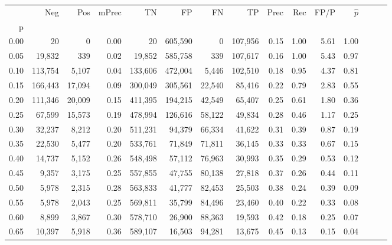 \begin{tabular}{rrrrrrrrrrrrrrr}
\toprule
{} &      Neg &     Pos & mPrec &       TN &       FP &       FN &       TP &  Prec &   Rec &  FP/P & $\hat{p}$ \\
p    &          &         &       &          &          &          &          &       &       &       &           \\
\midrule
0.00 &       20 &       0 &  0.00 &       20 &  605,590 &        0 &  107,956 &  0.15 &  1.00 &  5.61 &      1.00 \\
0.05 &   19,832 &     339 &  0.02 &   19,852 &  585,758 &      339 &  107,617 &  0.16 &  1.00 &  5.43 &      0.97 \\
0.10 &  113,754 &   5,107 &  0.04 &  133,606 &  472,004 &    5,446 &  102,510 &  0.18 &  0.95 &  4.37 &      0.81 \\
0.15 &  166,443 &  17,094 &  0.09 &  300,049 &  305,561 &   22,540 &   85,416 &  0.22 &  0.79 &  2.83 &      0.55 \\
0.20 &  111,346 &  20,009 &  0.15 &  411,395 &  194,215 &   42,549 &   65,407 &  0.25 &  0.61 &  1.80 &      0.36 \\
0.25 &   67,599 &  15,573 &  0.19 &  478,994 &  126,616 &   58,122 &   49,834 &  0.28 &  0.46 &  1.17 &      0.25 \\
0.30 &   32,237 &   8,212 &  0.20 &  511,231 &   94,379 &   66,334 &   41,622 &  0.31 &  0.39 &  0.87 &      0.19 \\
0.35 &   22,530 &   5,477 &  0.20 &  533,761 &   71,849 &   71,811 &   36,145 &  0.33 &  0.33 &  0.67 &      0.15 \\
0.40 &   14,737 &   5,152 &  0.26 &  548,498 &   57,112 &   76,963 &   30,993 &  0.35 &  0.29 &  0.53 &      0.12 \\
0.45 &    9,357 &   3,175 &  0.25 &  557,855 &   47,755 &   80,138 &   27,818 &  0.37 &  0.26 &  0.44 &      0.11 \\
0.50 &    5,978 &   2,315 &  0.28 &  563,833 &   41,777 &   82,453 &   25,503 &  0.38 &  0.24 &  0.39 &      0.09 \\
0.55 &    5,978 &   2,043 &  0.25 &  569,811 &   35,799 &   84,496 &   23,460 &  0.40 &  0.22 &  0.33 &      0.08 \\
0.60 &    8,899 &   3,867 &  0.30 &  578,710 &   26,900 &   88,363 &   19,593 &  0.42 &  0.18 &  0.25 &      0.07 \\
0.65 &   10,397 &   5,918 &  0.36 &  589,107 &   16,503 &   94,281 &   13,675 &  0.45 &  0.13 &  0.15 &      0.04 \\

\end{tabular}
